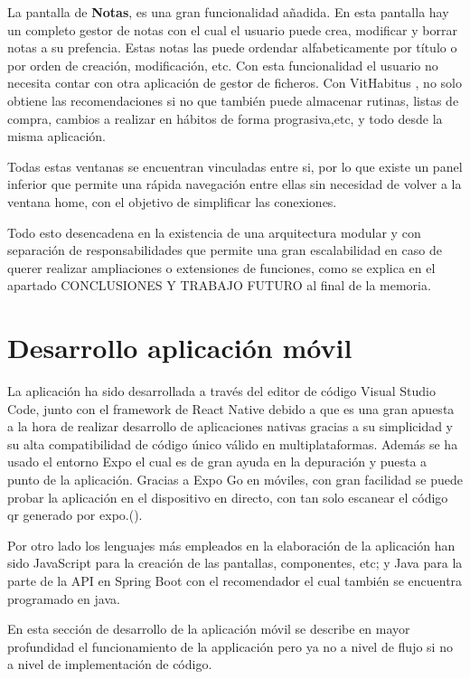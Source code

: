 La pantalla de \textbf{Notas}, es una gran funcionalidad añadida. En esta pantalla hay un completo gestor de notas con el cual el usuario puede crea, modificar y borrar notas a su prefencia. Estas notas las puede ordendar alfabeticamente por título o por orden de creación, modificación, etc. Con esta funcionalidad el usuario no necesita contar con otra aplicación de gestor de ficheros. Con VitHabitus , no solo obtiene las recomendaciones si no que también puede almacenar rutinas, listas de compra, cambios a realizar en hábitos de forma prograsiva,etc, y todo desde la misma aplicación.

Todas estas ventanas se encuentran vinculadas entre si, por lo que existe un panel inferior que permite una rápida navegación entre ellas sin necesidad de volver a la ventana home, con el objetivo de simplificar las conexiones.

Todo esto desencadena en la existencia de una arquitectura modular y con separación de responsabilidades que permite una gran escalabilidad en caso de querer realizar ampliaciones o extensiones de funciones, como se explica en el apartado CONCLUSIONES Y TRABAJO FUTURO al final de la memoria.


\section{Desarrollo aplicación móvil}

La aplicación ha sido desarrollada a través del editor de código Visual Studio Code, junto con el framework de React Native debido a que es una gran apuesta a la hora de realizar desarrollo de aplicaciones nativas gracias a su simplicidad y su alta compatibilidad de código único válido en multiplataformas. Además se ha usado el entorno Expo el cual es de gran ayuda en la depuración y puesta a punto de la aplicación. Gracias a Expo Go en móviles, con gran facilidad se puede probar la aplicación en el dispositivo en directo, con tan solo escanear el código qr generado por expo.(\cite{ibm_info}). 

Por otro lado los lenguajes más empleados en la elaboración de la aplicación han sido JavaScript para la creación de las pantallas, componentes, etc; y Java para la parte de la API en Spring Boot con el recomendador el cual también se encuentra programado en java.

En esta sección de desarrollo de la aplicación móvil se describe en mayor profundidad el funcionamiento de la applicación pero ya no a nivel de flujo si no a nivel de implementación de código.

